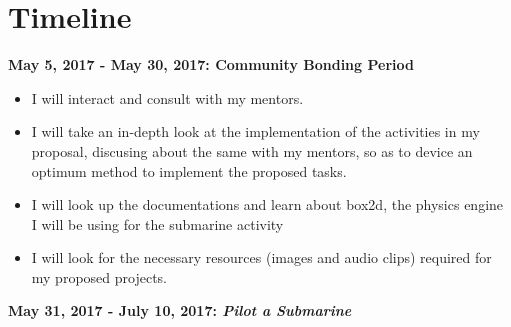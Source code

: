 \documentclass[preprint,12pt]{elsarticle}
\begin{document}
\section{Timeline}
\label{S:1}

\textbf{May 5, 2017 - May 30, 2017: Community Bonding Period}

\begin{itemize}
\item I will interact and consult with my mentors.
\item I will take an in-depth look at the implementation of the activities in my proposal, discusing about the same with my mentors, so as to device an optimum method to implement the proposed tasks.
\item I will look up the documentations and learn about box2d, the physics engine I will be using for the submarine activity
\item I will look for the necessary resources (images and audio clips) required for my proposed projects.
\end{itemize}

\textbf{May 31, 2017 - July 10, 2017: \textit{Pilot a Submarine}}
\end{document}
